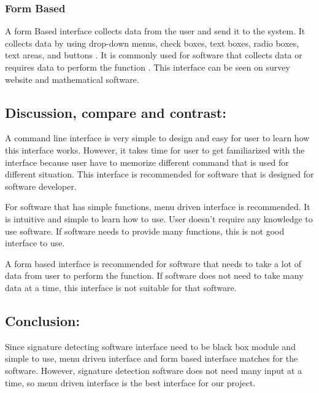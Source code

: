 \documentclass[onecolumn, draftclsnofoot,10pt, compsoc]{IEEEtran}
\begin{document}
\subsubsection{Form Based}
A form Based interface collects data from the user and send it to the system. It collects data by using drop-down menus, check boxes, text boxes, radio boxes, text areas, and buttons \cite{UIM}. It is commonly used for software that collects data or requires data to perform the function \cite{UIM}. This interface can be seen on survey website and mathematical software.  

\subsection{Discussion, compare and contrast:}
A command line interface is very simple to design and easy for user to learn how this interface works. However, it takes time for user to get familiarized with the interface because user have to memorize different command that is used for different situation. This interface is recommended for software that is designed for software developer. 

For software that has simple functions, menu driven interface is recommended. It is intuitive and simple to learn how to use. User doesn\rq t require any knowledge to use software. If software needs to provide many functions, this is not good interface to use.

A form based interface is recommended for software that needs to take a lot of data from user to perform the function. If software does not need to take many data at a time, this interface is not suitable for that software.


\subsection{Conclusion:}
Since signature detecting software interface need to be black box module and simple to use, menu driven interface and form based interface matches for the software. However, signature detection software does not need many input at a time, so menu driven interface is the best interface for our project.

\newpage
\nocite{*}


\end{document}

